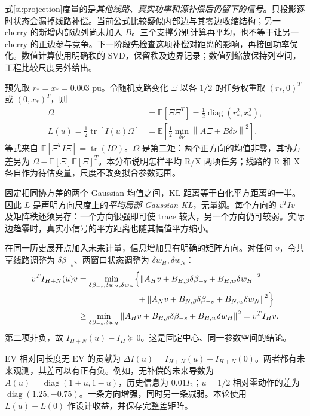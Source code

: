 \documentclass[UTF8,fontset=fandol,11pt,a4paper]{ctexart}
\newcommand{\norm}[1]{\left\lVert#1\right\rVert}
\begin{document}
式\eqref{si:projection}度量的是\emph{其他线路、真实功率和源补偿后仍留下的信号}。只投影逐时状态会漏掉线路补偿。当前公式比较疑似内部边与其零边收缩结构；另一 cherry 的新增内部边列尚未加入 $B$。三个支撑分别计算再平均，也不等于让另一 cherry 的正边参与竞争。下一阶段先检查这项补偿对距离的影响，再接回功率优化。数值计算使用明确秩的 SVD，保留秩及边界记录；数值列缩放保持列空间，工程比较尺度另外给出。

预先取 $r_*=x_*=0.003$ pu。令随机支路变化 $\Xi$ 以各 $1/2$ 的任务权重取 $(r_*,0)^T$ 或 $(0,x_*)^T$，则
\begin{align}
 \Omega&=\mathbb E[\Xi\Xi^T]=\tfrac12\operatorname{diag}(r_*^2,x_*^2),\nonumber\\
 \boxed{L(u)=\tfrac12\operatorname{tr}[I(u)\Omega]}
 &=\mathbb E\!\left[\tfrac12\min_{\delta\nu}\norm{A\Xi+B\delta\nu}^2\right].
 \label{si:scale}
\end{align}
等式来自 $\mathbb E[\Xi^TI\Xi]=\operatorname{tr}(I\Omega)$。$\Omega$ 是第二矩：两个正方向的均值非零，其协方差另为 $\Omega-\mathbb E[\Xi]\mathbb E[\Xi]^T$。本分布说明怎样平均 R/X 两项任务；线路的 R 和 X 各自作为待估变量，尺度不改变拟合参数范围。

固定相同协方差的两个 Gaussian 均值之间，KL 距离等于白化平方距离的一半。因此 $L$ 是声明方向尺度上的\emph{平均局部 Gaussian KL}，无量纲。每个方向的 $v^TIv$ 及矩阵秩还须另存：一个方向很强即可使 trace 较大，另一个方向仍可较弱。实际边趋零时，真实小信号的平方距离也随其幅值平方缩小。

在同一历史展开点加入未来计量，信息增加具有明确的矩阵方向。对任何 $v$，令共享线路调整为 $\delta\beta_{-s}$、两窗口状态调整为 $\delta w_H,\delta w_N$：
\begin{align}
 v^TI_{H+N}(u)v
 &=\min_{\delta\beta_{-s},\delta w_H,\delta w_N}
 \Bigl\{\norm{A_Hv+B_{H,\beta}\delta\beta_{-s}+B_{H,w}\delta w_H}^2\nonumber\\
 &\hspace{25mm}+\norm{A_Nv+B_{N,\beta}\delta\beta_{-s}+B_{N,w}\delta w_N}^2\Bigr\}\nonumber\\
 &\ge\min_{\delta\beta_{-s},\delta w_H}
 \norm{A_Hv+B_{H,\beta}\delta\beta_{-s}+B_{H,w}\delta w_H}^2
 =v^TI_Hv.
 \label{si:history-monotone}
\end{align}
第二项非负，故 $I_{H+N}(u)-I_H\succeq0$。这是固定中心、同一参数空间的结论。

EV 相对同长度无 EV 的贡献为 $\Delta I(u)=I_{H+N}(u)-I_{H+N}(0)$。两者都有未来观测，其差可以有正有负。例如，无补偿的未来导数为 $A(u)=\operatorname{diag}(1+u,1-u)$，历史信息为 $0.01I_2$；$u=1/2$ 相对零动作的差为 $\operatorname{diag}(1.25,-0.75)$。一条方向增强，同时另一条减弱。本轮使用 $L(u)-L(0)$ 作设计收益，并保存完整差矩阵。
\end{document}
